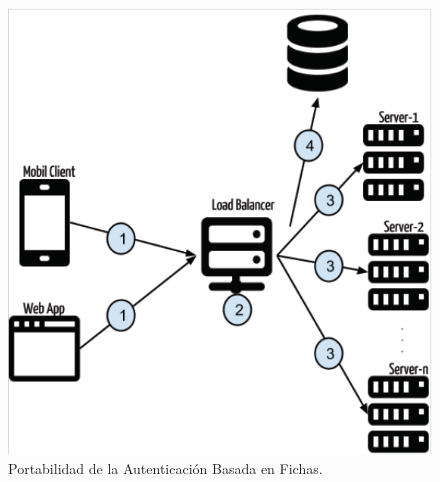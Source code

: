     \begin{figure}
        \begin{center}
            \includegraphics[width=.8\textwidth]{figures/tokenbaservers}
        \end{center}
        \caption{Portabilidad de la Autenticación Basada en Fichas.}
    \end{figure}
    
\pagebreak